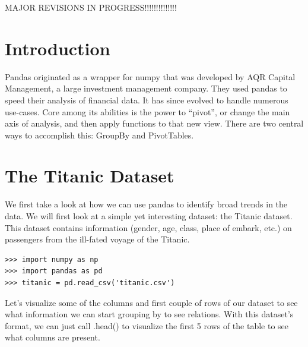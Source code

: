 \label{lab:pandas3}

MAJOR REVISIONS IN PROGRESS!!!!!!!!!!!!!!

\section*{Introduction}
Pandas originated as a wrapper for numpy that was developed by AQR Capital Management, a large investment management company. They used pandas to speed their analysis of financial data. It has since evolved to handle numerous use-cases. Core among its abilities is the power to ``pivot'', or change the main axis of analysis, and then apply functions to that new view. There are two central ways to accomplish this: GroupBy and PivotTables.

\section*{The Titanic Dataset}
We first take a look at how we can use pandas to identify broad trends in the data. We will first look at a simple yet interesting dataset: the Titanic dataset. This dataset contains information (gender, age, class, place of embark, etc.) on passengers from the ill-fated voyage of the Titanic.

\begin{lstlisting}
>>> import numpy as np
>>> import pandas as pd
>>> titanic = pd.read_csv('titanic.csv')
\end{lstlisting}

Let's visualize some of the columns and first couple of rows of our dataset to see what information we can start grouping by to see relations. With this dataset's format, we can just call .head() to visualize the first 5 rows of the table to see what columns are present.

